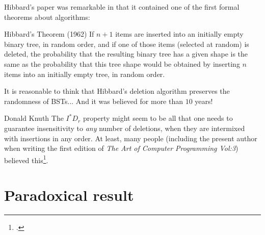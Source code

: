 \documentclass{beamer}
\begin{document}
\begin{frame}
    Hibbard’s paper was remarkable in that it contained one of the first formal theorems about algorithms:
    \pause
    \begin{block}{Hibbard's Theorem (1962)}
        If $n + 1$ items are inserted into an initially empty binary tree, in random order, and if one of those items (selected at random) is deleted, the probability that the resulting binary tree has a given shape is the same as the probability that this tree shape would be obtained by inserting $n$ items into an initially empty tree, in random order.
    \end{block}
    \pause
    It is reasonable to think that Hibbard's deletion algorithm preserves the randomness of BSTs...
    \pause
    And it was believed for more than $10$ years!
\end{frame}

\begin{frame}
    \begin{block}{Donald Knuth}
        The $I^*D_r$ property might seem to be all that one needs to guarantee insensitivity to \textit{any} number of deletions, when they are intermixed with insertions in any order. At least, many people (including the present author when writing the first edition of \textit{The Art of Computer Programming Vol:3}) believed this\footcite{knuth1977deletions}.
    \end{block}
\end{frame}

\section{Paradoxical result}
\end{document}
